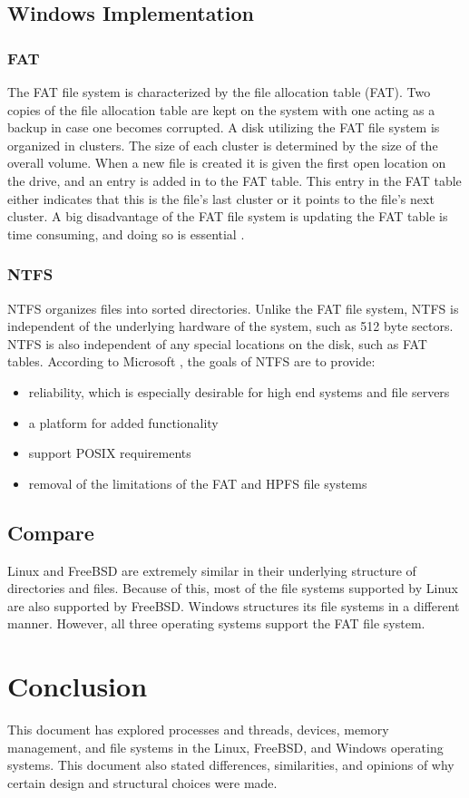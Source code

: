 \documentclass[onecolumn,draftclsnofoot, 10pt, compsoc]{IEEEtran}
\begin{document}
	\subsection{Windows Implementation}
		\subsubsection{FAT}
			The FAT file system is characterized by the file allocation table (FAT).
			Two copies of the file allocation table are kept on the system with one acting as a backup in case one becomes corrupted. 
			A disk utilizing the FAT file system is organized in clusters.
			The size of each cluster is determined by the size of the overall volume. 
			When a new file is created it is given the first open location on the drive, and an entry is added in to the FAT table.
			This entry in the FAT table either indicates that this is the file's last cluster or it points to the file's next cluster.
			A big disadvantage of the FAT file system is updating the FAT table is time consuming, and doing so is essential \cite{windowsFAT}.
	
		\subsubsection{NTFS}
			NTFS organizes files into sorted directories.
			Unlike the FAT file system, NTFS is independent of the underlying hardware of the system, such as 512 byte sectors. 
			NTFS is also independent of any special locations on the disk, such as FAT tables.
			According to Microsoft \cite{windowsFAT}, the goals of NTFS are to provide:
			\begin{itemize}
				\item{
					reliability, which is especially desirable for high end systems and file servers}
				\item{
					a platform for added functionality}
				\item{
					support POSIX requirements}
				\item{
					removal of the limitations of the FAT and HPFS file systems}
			\end{itemize}

	\subsection{Compare}
		Linux and FreeBSD are extremely similar in their underlying structure of directories and files.
		Because of this, most of the file systems supported by Linux are also supported by FreeBSD.
		Windows structures its file systems in a different manner.
		However, all three operating systems support the FAT file system.

\section{Conclusion}
	This document has explored processes and threads, devices, memory management, and file systems in the Linux, FreeBSD, and Windows operating systems.
	This document also stated differences, similarities, and opinions of why certain design and structural choices were made.



\end{document}
